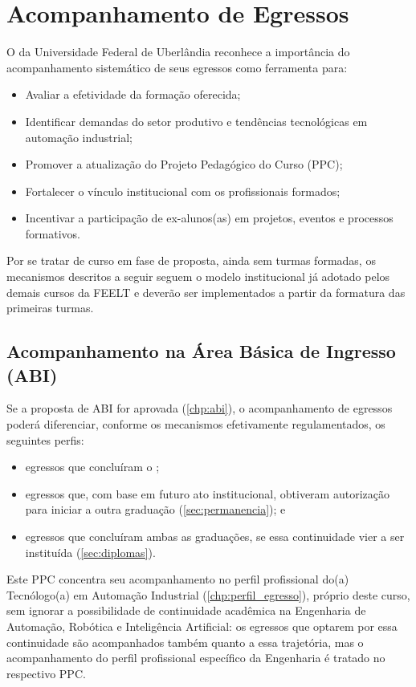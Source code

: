\chapter{Acompanhamento de Egressos}
\label{chp:acompanhamento_egresso}

O \ppccurso da Universidade Federal de Uberlândia reconhece a importância do acompanhamento sistemático de seus egressos como ferramenta para:

\begin{itemize}
    \item Avaliar a efetividade da formação oferecida;
    \item Identificar demandas do setor produtivo e tendências tecnológicas em automação industrial;
    \item Promover a atualização do Projeto Pedagógico do Curso (PPC);
    \item Fortalecer o vínculo institucional com os profissionais formados;
    \item Incentivar a participação de ex-alunos(as) em projetos, eventos e processos formativos.
\end{itemize}

Por se tratar de curso em fase de proposta, ainda sem turmas formadas, os mecanismos descritos a seguir seguem o modelo institucional já adotado pelos demais cursos da FEELT e deverão ser implementados a partir da formatura das primeiras turmas.

\section{Acompanhamento na Área Básica de Ingresso (ABI)}

Se a proposta de ABI for aprovada (\autoref{chp:abi}), o acompanhamento de egressos poderá diferenciar, conforme os mecanismos efetivamente regulamentados, os seguintes perfis:

\begin{itemize}
    \item egressos que concluíram o \ppccurso;
    \item egressos que, com base em futuro ato institucional, obtiveram autorização para iniciar a outra graduação (\autoref{sec:permanencia}); e
    \item egressos que concluíram ambas as graduações, se essa continuidade vier a ser instituída (\autoref{sec:diplomas}).
\end{itemize}

Este PPC concentra seu acompanhamento no perfil profissional do(a) Tecnólogo(a) em Automação Industrial (\autoref{chp:perfil_egresso}), próprio deste curso, sem ignorar a possibilidade de continuidade acadêmica na Engenharia de Automação, Robótica e Inteligência Artificial: os egressos que optarem por essa continuidade são acompanhados também quanto a essa trajetória, mas o acompanhamento do perfil profissional específico da Engenharia é tratado no respectivo PPC.


